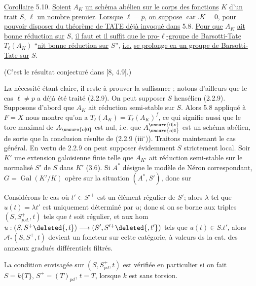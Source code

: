 \uline{Corollaire} 5.10. \uline{Soient} $A_K$ \uline{un schéma abélien sur le corps des fonctions} $K$ \uline{d'un trait} $S$, $\ell$ \uline{un nombre premier}. \uline{Lorsque} $\ell=p$, \uline{on suppose} $\operatorname{car}.K=0$, \uline{pour pouvoir disposer du théorème de TATE déjà invoqué dans} 5.8. \uline{Pour que} $A_K$ \uline{ait bonne réduction sur} $S$, \uline{il faut et il suffit que le pro-$\ell$-groupe de Barsotti-Tate} $T_\ell(A_K)$ ``\uline{ait bonne réduction sur} $S$'', \uline{i.e.} \uline{se prolonge en un groupe de Barsotti-Tate sur} $S$.

(C'est le résultat conjecturé dans [8, 4.9].)

La nécessité étant claire, il reste à prouver la suffisance ; notons d'ailleurs que le cas $\ell\neq p$ a déjà été traité (2.2.9). On peut supposer $S$ hensélien (2.2.9). Supposons d'abord que $A_K$ ait réduction semi-stable sur $S$. Alors 5.8 appliqué à $F=X$ nous montre qu'on a $T_\ell(A_K)=T_\ell(A_K)^f$, ce qui signifie aussi que le tore maximal de $A_{\unsure{o|0}}$ est nul, i.e. que $A_{\unsure{o|0}}^{\unsure{0|o}}$ est un schéma abélien, de sorte que la conclusion résulte de (2.2.9 (iii$^\circ$)). Traitons maintenant le cas général. En vertu de 2.2.9 on peut supposer évidemment $S$ strictement local. Soir $K'$ une extension galoisienne finie telle que $A_{K'}$ ait réduction semi-stable sur le normalisé $S'$ de $S$ dans $K'$ (3.6). Si $A^*$ désigne le modèle de Néron correspondant, $G=\operatorname{Gal}(K'/K)$ opère sur la situation $(A^*,S')$, donc sur

Considérons le cas où $t'\in S'^+$ est un élément régulier de $S'$; alors $\lambda$ tel que $u(t)=\lambda t'$ est uniquement déterminé par $u$; donc si on se borne aux triples $(S,S^+_{p.d.},t)$ tels que $t$ soit régulier, et aux hom $u:(S,S^+\deleted{,t})\longrightarrow(S',S'^+\deleted{,t'})$ tels que $u(t)\in S.t'$, alors $\mathcal A_*(S,S^+,t)$ devient un foncteur sur cette catégorie, à valeurs ds la cat. des  anneaux gradués   différentiels filtrés.

La condition envisagée sur $(S,S^+_{pd},t)$ est vérifiée en particulier si on fait $S=k\{T\}$, $S^+=(T)_{pd}$, $t=T$, lorsque $k$ est sans torsion.


